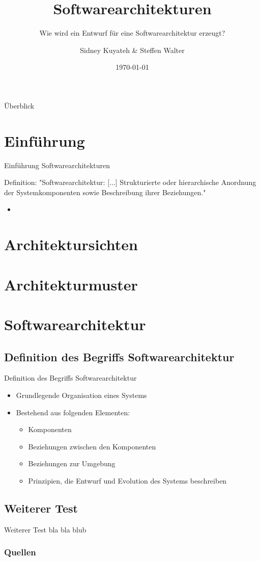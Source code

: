 \documentclass{beamer}
\title{Softwarearchitekturen}
\subtitle{Wie wird ein Entwurf für eine Softwarearchitektur erzeugt?}
\author{Sidney Kuyateh \& Steffen Walter}
\institute{Duale Hochschule Baden-Württemberg}
\date{\today}
\begin{document}
	\maketitle
	\begin{frame}{Überblick}
		\tableofcontents
	\end{frame}
		\section{Einführung}
		\begin{frame}{Einführung Softwarearchitekturen}
			\begin{block}{Definition:}
				"Softwarearchitektur: [...] Strukturierte oder hierarchische Anordnung der Systemkomponenten sowie Beschreibung ihrer Beziehungen."\cite[ S. 520]{balzert}
			\end{block}
		\begin{itemize}
			\item 
		\end{itemize}
		
		\end{frame}
		
		\section{Architektursichten}
		\section{Architekturmuster}
	
	\section{Softwarearchitektur}
		\subsection{Definition des Begriffs Softwarearchitektur}
			\begin{frame}{Definition des Begriffs Softwarearchitektur}
				\begin{itemize}
					\item Grundlegende Organisation eines Systems
					\item Bestehend aus folgenden Elementen:
					\begin{itemize}
						\item Komponenten
						\item Beziehungen zwischen den Komponenten
						\item Beziehungen zur Umgebung
						\item Prinzipien, die Entwurf und Evolution des Systems beschreiben
					\end{itemize}
				\end{itemize}
			\end{frame}
		\subsection{Weiterer Test}
			\begin{frame}{Weiterer Test}
				bla bla blub
			\end{frame}
	\begin{frame}[allowframebreaks]
		\frametitle{Quellen}
		
		
	\end{frame}
\end{document}

